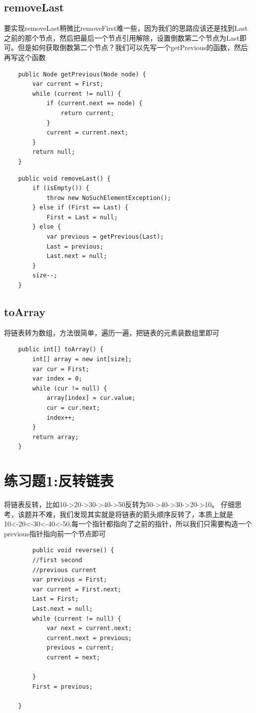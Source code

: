 \documentclass[
	11pt,
	fleqn,
	a4paper,
]{LegrandOrangeBook}
\begin{document}
\subsection{removeLast}
要实现removeLast稍微比removeFirst难一些，因为我们的思路应该还是找到Last之前的那个节点，然后把最后一个节点引用解除，设置倒数第二个节点为Last即可。但是如何获取倒数第二个节点？我们可以先写一个getPrevious的函数，然后再写这个函数
\begin{verbatim}
    public Node getPrevious(Node node) {
        var current = First;
        while (current != null) {
            if (current.next == node) {
                return current;
            }
            current = current.next;
        }
        return null;
    }
\end{verbatim}
\begin{verbatim}
    public void removeLast() {
        if (isEmpty()) {
            throw new NoSuchElementException();
        } else if (First == Last) {
            First = Last = null;
        } else {
            var previous = getPrevious(Last);
            Last = previous;
            Last.next = null;
        }
        size--;
    }
\end{verbatim}
\subsection{toArray}
将链表转为数组，方法很简单，遍历一遍，把链表的元素装数组里即可
\begin{verbatim}
    public int[] toArray() {
        int[] array = new int[size];
        var cur = First;
        var index = 0;
        while (cur != null) {
            array[index] = cur.value;
            cur = cur.next;
            index++;
        }
        return array;
    }
\end{verbatim}
\section{练习题1:反转链表}
\begin{example}
    将链表反转，比如10->20->30->40->50反转为50->40->30->20->10。
    仔细思考，该题并不难，我们发现其实就是将链表的箭头顺序反转了，本质上就是10<-20<-30<-40<-50,每一个指针都指向了之前的指针，所以我们只需要构造一个previous指针指向前一个节点即可
    \begin{verbatim}
	    public void reverse() {
        //first second
        //previous current
        var previous = First;
        var current = First.next;
        Last = First;
        Last.next = null;
        while (current != null) {
            var next = current.next;
            current.next = previous;
            previous = current;
            current = next;

        }
        First = previous;

    }
\end{verbatim}
\end{example}
\end{document}
